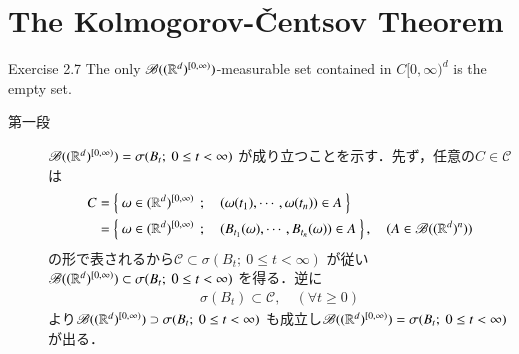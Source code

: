 \section{The Kolmogorov-\v{C}entsov Theorem}
	\begin{itembox}[l]{Exercise 2.7}
		The only $\mathscr{B}((\mathbb{R}^d)^{[0,\infty)})$-measurable set contained 
		in $C[0,\infty)^d$ is the empty set.
	\end{itembox}
	
	\begin{prf}\mbox{}
		\begin{description}
			\item[第一段]
				$\borel{(\R^d)^{[0,\infty)}} = \sigma(B_t;\ 0 \leq t < \infty)$
				が成り立つことを示す．先ず，任意の$C \in \mathscr{C}$は
				\begin{align}
					C &= \left\{\ \omega \in (\mathbb{R}^d)^{[0,\infty)}\ \, ; \quad (\omega(t_1),\cdots,\omega(t_n)) \in A\ \right\} \\
					&=  \left\{\ \omega \in (\mathbb{R}^d)^{[0,\infty)}\ \, ; \quad (B_{t_1}(\omega),\cdots,B_{t_n}(\omega)) \in A\ \right\},
					\quad (A \in \mathscr{B}((\mathbb{R}^d)^n))
				\end{align}
				の形で表されるから$\mathscr{C} \subset \sigma(B_t;\ 0 \leq t < \infty)$
				が従い$\mathscr{B}((\mathbb{R}^d)^{[0,\infty)}) \subset \sigma(B_t;\ 0 \leq t < \infty)$
				を得る．逆に
				\begin{align}
					\sigma(B_t) \subset \mathscr{C},
					\quad (\forall t \geq 0)
				\end{align}
				より$\mathscr{B}((\mathbb{R}^d)^{[0,\infty)}) \supset \sigma(B_t;\ 0 \leq t < \infty)$
				も成立し$\borel{(\R^d)^{[0,\infty)}} = \sigma(B_t;\ 0 \leq t < \infty)$
				が出る．
				

\end{description}
\end{prf}
